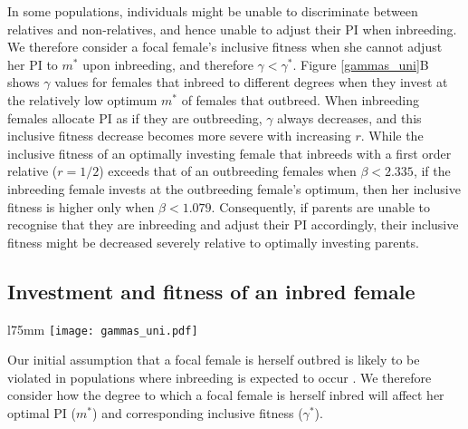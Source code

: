 \documentclass[10pt,letterpaper]{article}
\begin{document}
In some populations, individuals might be unable to discriminate between relatives and non-relatives, and hence unable to adjust their PI when inbreeding. We therefore consider a focal female's inclusive fitness when she cannot adjust her PI to $m^{*}$ upon inbreeding, and therefore $\gamma < \gamma^{*}$. Figure \ref{gammas_uni}B shows $\gamma$ values for females that inbreed to different degrees when they invest at the relatively low optimum $m^{*}$ of females that outbreed. When inbreeding females allocate PI as if they are outbreeding, $\gamma$ always decreases, and this inclusive fitness decrease becomes more severe with increasing $r$. While the inclusive fitness of an optimally investing female that inbreeds with a first order relative ($r=1/2$) exceeds that of an outbreeding females when $\beta < 2.335$, if the inbreeding female invests at the outbreeding female's optimum, then her inclusive fitness is higher only when $\beta < 1.079$. Consequently, if parents are unable to recognise that they are inbreeding and adjust their PI accordingly, their inclusive fitness might be decreased severely relative to optimally investing parents.

\subsection*{Investment and fitness of an inbred female}

\begin{wrapfigure}[25]{l}{75mm}
\texttt{[image: gammas\_uni.pdf]}
\captionsetup{labelformat=empty} 
\caption{} 
\label{gammas_uni} %
\end{wrapfigure} %
Our initial assumption that a focal female is herself outbred is likely to be violated in populations where inbreeding is expected to occur \cite[][]{Duthie2015a}. We therefore consider how the degree to which a focal female is herself inbred will affect her optimal PI ($m^{*}$) and corresponding inclusive fitness ($\gamma^{*}$).
\end{document}
